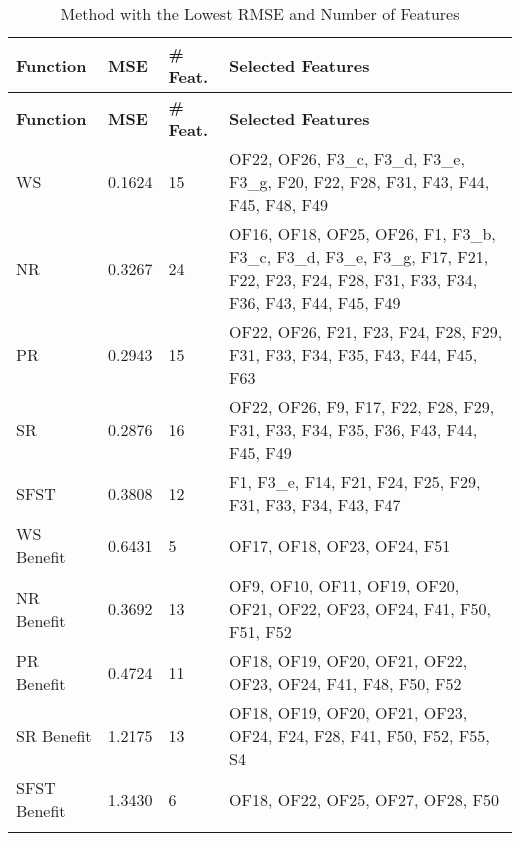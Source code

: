 \begin{longtable}{|p{3cm}|p{2cm}|p{2cm}|p{8cm}|}
\hline
\textbf{Function} & \textbf{MSE} & \textbf{\# Feat.} & \textbf{Selected Features} \\ \hline
\endfirsthead
\hline
\textbf{Function} & \textbf{MSE} & \textbf{\# Feat.} & \textbf{Selected Features} \\ \hline
\endhead

WS & 0.1624 & 15 & OF22, OF26, F3\_c, F3\_d, F3\_e, F3\_g, F20, F22, F28, F31, F43, F44, F45, F48, F49 \\ \hline
NR & 0.3267 & 24 & OF16, OF18, OF25, OF26, F1, F3\_b, F3\_c, F3\_d, F3\_e, F3\_g, F17, F21, F22, F23, F24, F28, F31, F33, F34, F36, F43, F44, F45, F49 \\ \hline
PR & 0.2943 & 15 & OF22, OF26, F21, F23, F24, F28, F29, F31, F33, F34, F35, F43, F44, F45, F63 \\ \hline
SR & 0.2876 & 16 & OF22, OF26, F9, F17, F22, F28, F29, F31, F33, F34, F35, F36, F43, F44, F45, F49 \\ \hline
SFST & 0.3808 & 12 & F1, F3\_e, F14, F21, F24, F25, F29, F31, F33, F34, F43, F47 \\ \hline
WS Benefit & 0.6431 & 5 & OF17, OF18, OF23, OF24, F51 \\ \hline
NR Benefit & 0.3692 & 13 & OF9, OF10, OF11, OF19, OF20, OF21, OF22, OF23, OF24, F41, F50, F51, F52 \\ \hline
PR Benefit & 0.4724 & 11 & OF18, OF19, OF20, OF21, OF22, OF23, OF24, F41, F48, F50, F52 \\ \hline
SR Benefit & 1.2175 & 13 & OF18, OF19, OF20, OF21, OF23, OF24, F24, F28, F41, F50, F52, F55, S4 \\ \hline
SFST Benefit & 1.3430 & 6 & OF18, OF22, OF25, OF27, OF28, F50 \\ \hline

\caption{Method with the Lowest RMSE and Number of Features}
\label{fig_reg_spec:lowest_rmse_feat}
\end{longtable}
